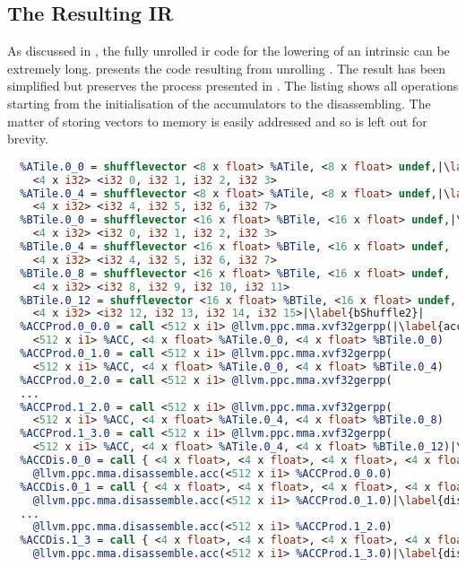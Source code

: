 \documentclass[\main/thesis.tex]{subfiles}
\begin{document}
\subsection{The Resulting IR}
\label{sec:unrolled}
As discussed in , the fully unrolled \gls{ir} code for the \gls{lowering} of an \gls{intrinsic} can be extremely long.
 presents the code resulting from unrolling .
The result has been simplified but preserves the process presented in .
The listing shows all operations starting from the initialisation of the accumulators to the disassembling.
The matter of storing vectors to memory is easily addressed and so is left out for brevity.

\begin{lstlisting}[caption={[Example Lowering of \code{llvm.matrix.multiply.*}.]An example lowering of the \code{llvm.matrix.multiply.*} intrinsic for a $8 \times 1 \times 16$ computation.},
      label=lst:unrolled,language=llvm,basicstyle=\footnotesize,float,escapechar=|]
  %ACC = call <512 x i1> @llvm.ppc.mma.xxsetaccz()|\label{accz}|
  %ATile.0_0 = shufflevector <8 x float> %ATile, <8 x float> undef,|\label{aShuffle1}|
    <4 x i32> <i32 0, i32 1, i32 2, i32 3>
  %ATile.0_4 = shufflevector <8 x float> %ATile, <8 x float> undef,|\label{aShuffle2}|
    <4 x i32> <i32 4, i32 5, i32 6, i32 7>
  %BTile.0_0 = shufflevector <16 x float> %BTile, <16 x float> undef,|\label{bShuffle1}|
    <4 x i32> <i32 0, i32 1, i32 2, i32 3>
  %BTile.0_4 = shufflevector <16 x float> %BTile, <16 x float> undef,
    <4 x i32> <i32 4, i32 5, i32 6, i32 7>
  %BTile.0_8 = shufflevector <16 x float> %BTile, <16 x float> undef,
    <4 x i32> <i32 8, i32 9, i32 10, i32 11>
  %BTile.0_12 = shufflevector <16 x float> %BTile, <16 x float> undef,
    <4 x i32> <i32 12, i32 13, i32 14, i32 15>|\label{bShuffle2}|
  %ACCProd.0_0.0 = call <512 x i1> @llvm.ppc.mma.xvf32gerpp(|\label{accsBegin}|
    <512 x i1> %ACC, <4 x float> %ATile.0_0, <4 x float> %BTile.0_0)
  %ACCProd.0_1.0 = call <512 x i1> @llvm.ppc.mma.xvf32gerpp(
    <512 x i1> %ACC, <4 x float> %ATile.0_0, <4 x float> %BTile.0_4)
  %ACCProd.0_2.0 = call <512 x i1> @llvm.ppc.mma.xvf32gerpp(
  ...
  %ACCProd.1_2.0 = call <512 x i1> @llvm.ppc.mma.xvf32gerpp(
    <512 x i1> %ACC, <4 x float> %ATile.0_4, <4 x float> %BTile.0_8)
  %ACCProd.1_3.0 = call <512 x i1> @llvm.ppc.mma.xvf32gerpp(
    <512 x i1> %ACC, <4 x float> %ATile.0_4, <4 x float> %BTile.0_12)|\label{accsEnd}|
  %ACCDis.0_0 = call { <4 x float>, <4 x float>, <4 x float>, <4 x float> }
    @llvm.ppc.mma.disassemble.acc(<512 x i1> %ACCProd.0_0.0)
  %ACCDis.0_1 = call { <4 x float>, <4 x float>, <4 x float>, <4 x float> }
    @llvm.ppc.mma.disassemble.acc(<512 x i1> %ACCProd.0_1.0)|\label{dissStart}|
  ...
    @llvm.ppc.mma.disassemble.acc(<512 x i1> %ACCProd.1_2.0)
  %ACCDis.1_3 = call { <4 x float>, <4 x float>, <4 x float>, <4 x float> }
    @llvm.ppc.mma.disassemble.acc(<512 x i1> %ACCProd.1_3.0)|\label{dissEnd}|
\end{lstlisting}
\end{document}
